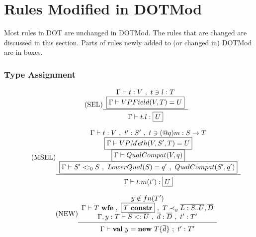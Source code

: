 \section{Rules Modified in DOTMod}

Most rules in DOT are unchanged in DOTMod.
The rules that are changed are discussed in this section.
Parts of rules newly added to (or changed in) DOTMod are in boxes.

\subsubsection{Type Assignment}

\begin{equation*}\tag{SEL}\label{equ-sel}
\begin{array}{c}
\Gamma \vdash t : V\ ,\ t \ni l : T \\
\boxed{\Gamma \vdash VPField(V, T) = U} \\
\midrule
\Gamma \vdash t.l : \boxed{U} \\
\end{array}
\end{equation*}

\vspace{0.4cm}

\begin{equation*}\tag{MSEL}\label{equ-msel}
\begin{array}{c}
\Gamma \vdash t: V\ ,\ t': S'\ ,\ t \ni (@q)m: S \rightarrow T \\
\boxed{\Gamma \vdash VPMeth(V,S',T) = U} \\
\boxed{\Gamma \vdash QualCompat(V,q)} \\
\boxed{\Gamma \vdash S' <:_0 S\ ,\ LowerQual(S) = q'\ ,\ QualCompat(S',q')} \\
\midrule
\Gamma \vdash t.m(t'): \boxed{U} \\
\end{array}
\end{equation*}

\vspace{0.4cm}

\begin{equation*}\tag{NEW}\label{equ-new}
\begin{array}{c}
y \notin fn(T') \\
\Gamma \vdash T\ {\bf wfe}\ ,\ \boxed{T\ {\bf constr}}\ ,\ T \prec_y \overline{L:S..U},\overline{D} \\
\Gamma,y:T \vdash \overline{S <: U}\ ,\ \overline{d}:\overline{D}\ ,\ t':T' \\
\midrule
\Gamma \vdash {\bf val}\ y = {\bf new}\ T \{ \overline{d} \}\ ;\ t':T' \\
\end{array}
\end{equation*}

